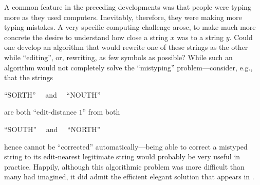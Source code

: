A common feature in the preceding developments was that people were
typing more as they used computers.  Inevitably, therefore, they were
making more typing mistakes.  A very specific computing challenge
arose, to make much more concrete the desire to understand how close a
string $x$ was to a string $y$.  Could one develop an algorithm that
would rewrite one of these strings as the other while ``editing'',
or, rewriting, as few symbols as possible?  While such an algorithm
would not completely solve the ``mistyping'' problem---consider, e.g.,
that the strings

\hspace*{.25in} ``SORTH'' \ \ and \ \ ``NOUTH''

\noindent
are both ``edit-distance $1$'' from both

\hspace*{.25in} ``SOUTH'' \ \ and \ \ ``NORTH''

\noindent
hence cannot be ``corrected'' automatically---being able to correct a
mistyped string to its edit-nearest legitimate string would probably
be very useful in practice.  Happily, although this algorithmic
problem was more difficult than many had imagined, it did admit the
efficient elegant solution that appears in \cite{WagnerF74}.







